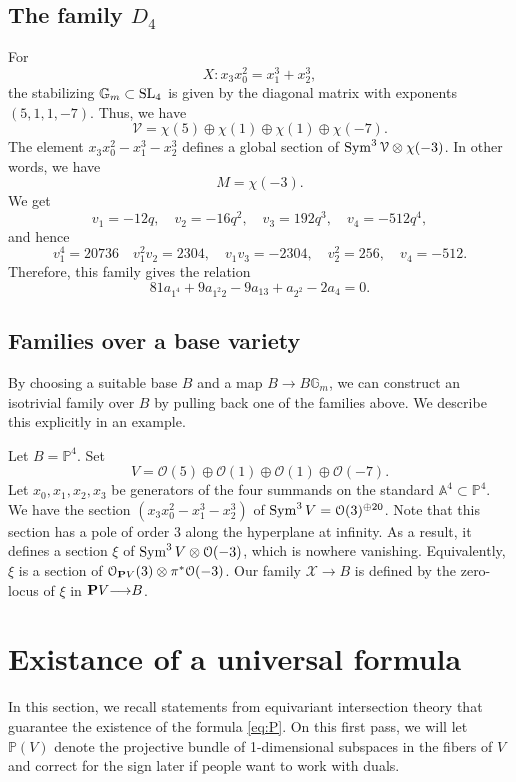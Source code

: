 \documentclass[12pt,reqno]{amsart}
\renewcommand{\to}{{\longrightarrow}}
\numberwithin{equation}{section}
\begin{document}
\subsection{The family $D_4$}
For
\[ X: x_3x_0^2 = x_1^3+x_2^3,\]
the stabilizing $\mathbb G_m \subset \SL_4$ is given by the diagonal matrix with exponents $(5,1,1,-7)$.
Thus, we have
\[ \mathcal V = \chi(5) \oplus \chi(1) \oplus \chi(1) \oplus \chi(-7).\]
The element $x_3x_0^2-x_1^3-x_2^3$ defines a global section of $\Sym^3 \mathcal V \otimes \chi(-3)$.
In other words, we have
\[ M = \chi(-3).\]
We get
\[ v_1 = -12q, \quad v_2 = -16q^2, \quad v_3 = 192q^3, \quad v_4 = -512q^4,\]
and hence
\[ v_1^4 = 20736 \quad v_1^2v_2 = 2304, \quad v_1v_3 = -2304, \quad v_2^2 = 256, \quad v_4 = -512.\]
Therefore, this family gives the relation
\begin{equation}\label{eqn:iso4}
  81a_{1^4} +9a_{1^2 2}- 9a_{13} +  a_{2^2}-2a_4  = 0.
\end{equation}

\subsection{Families over a base variety}
By choosing a suitable base $B$ and a map $B \to B \mathbb G_m$, we
can construct an isotrivial family over $B$ by pulling back one of the
families above.  We describe this explicitly in an example.

Let $B = \mathbb P^4$.  Set
\[V = \mathcal O(5) \oplus \mathcal O(1) \oplus \mathcal O(1) \oplus
  \mathcal O(-7).\] Let $x_0, x_1, x_2, x_3$ be generators of the four
summands on the standard $\mathbb A^4 \subset \mathbb P^4$.  We have
the section $(x_3x_0^2-x_1^3-x_2^3)$ of
$\Sym^3 V = \mathcal O(3)^{\oplus 20}$.  Note that this section has a
pole of order $3$ along the hyperplane at infinity.  As a result, it
defines a section $\xi$ of $\Sym^3 V \otimes \mathcal O(-3)$, which is
nowhere vanishing.  Equivalently, $\xi$ is a section of
$\mathcal O_{\P V}(3) \otimes \pi^* \mathcal O(-3)$.  Our family
$\mathcal X \to B$ is defined by the zero-locus of $\xi$ in
$\P V \to B$.

\appendix

\section{Existance of a universal formula}

In this section, we recall statements from equivariant intersection
theory that guarantee the existence of the formula \eqref{eq:P}. On
this first pass, we will let $\mathbb{P}(V)$ denote the projective
bundle of 1-dimensional subspaces in the fibers of $V$ and correct for
the sign later if people want to work with duals.
\end{document}
